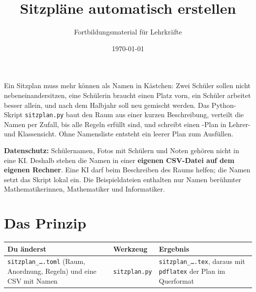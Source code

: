 



\title{Sitzpläne automatisch erstellen}
\author{Fortbildungsmaterial für Lehrkräfte}
\date{\today}
\pagestyle{plain}
\setlength{\parskip}{1.5em} %
\setlength{\emergencystretch}{4em} %




\maketitle

Ein Sitzplan muss mehr können als Namen in Kästchen: Zwei Schüler sollen nicht nebeneinandersitzen, eine Schülerin braucht einen Platz vorn, ein Schüler arbeitet besser allein, und nach dem Halbjahr soll neu gemischt werden. Das Python-Skript \texttt{sitzplan.py} baut den Raum aus einer kurzen Beschreibung, verteilt die Namen per Zufall, bis alle Regeln erfüllt sind, und schreibt einen -Plan in Lehrer- und Klassensicht. Ohne Namensliste entsteht ein leerer Plan zum Ausfüllen.

\begin{merke}
	\textbf{Datenschutz:} Schülernamen, Fotos mit Schülern und Noten gehören nicht in eine KI. Deshalb stehen die Namen in einer \textbf{eigenen CSV-Datei auf dem eigenen Rechner}. Eine KI darf beim Beschreiben des Raums helfen; die Namen setzt das Skript lokal ein. Die Beispieldateien enthalten nur Namen berühmter Mathematikerinnen, Mathematiker und Informatiker.
\end{merke}

\tableofcontents



\section{Das Prinzip}

\begin{center}
\begin{tabular}{@{}>{\raggedright\arraybackslash}p{4.6cm}>{\raggedright\arraybackslash}p{3.6cm}>{\raggedright\arraybackslash}p{6.6cm}@{}}
	\toprule
	\textbf{Du änderst} & \textbf{Werkzeug} & \textbf{Ergebnis} \\
	\midrule
	\texttt{sitzplan\_\dots.toml} (Raum, Anordnung, Regeln) und eine CSV mit Namen & \texttt{sitzplan.py} & \texttt{sitzplan\_\dots.tex}, daraus mit \texttt{pdflatex} der Plan im Querformat \\
	\bottomrule
\end{tabular}
\end{center}

